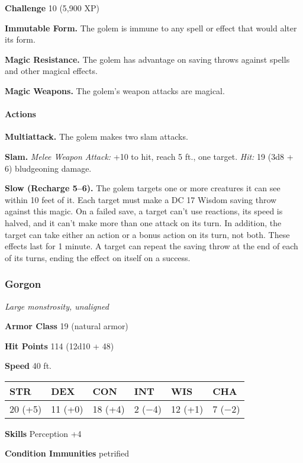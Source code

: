 \documentclass[
]{article}
\begin{document}
\textbf{Challenge} 10 (5,900 XP)

\textbf{Immutable Form.} The golem is immune to any spell or effect that
would alter its form.

\textbf{Magic Resistance.} The golem has advantage on saving throws
against spells and other magical effects.

\textbf{Magic Weapons.} The golem's weapon attacks are magical.

\hypertarget{actions-19}{%
\paragraph{Actions}\label{actions-19}}

\textbf{Multiattack.} The golem makes two slam attacks.

\textbf{Slam.} \emph{Melee Weapon Attack:} +10 to hit, reach 5 ft., one
target. \emph{Hit:} 19 (3d8 + 6) bludgeoning damage.

\textbf{Slow (Recharge 5--6).} The golem targets one or more creatures
it can see within 10 feet of it. Each target must make a DC 17 Wisdom
saving throw against this magic. On a failed save, a target can't use
reactions, its speed is halved, and it can't make more than one attack
on its turn. In addition, the target can take either an action or a
bonus action on its turn, not both. These effects last for 1 minute. A
target can repeat the saving throw at the end of each of its turns,
ending the effect on itself on a success.

\hypertarget{gorgon}{%
\subsubsection{Gorgon}\label{gorgon}}

\emph{Large monstrosity, unaligned}

\textbf{Armor Class} 19 (natural armor)

\textbf{Hit Points} 114 (12d10 + 48)

\textbf{Speed} 40 ft.

\begin{longtable}[]{@{}llllll@{}}
\toprule
STR & DEX & CON & INT & WIS & CHA\tabularnewline
\midrule
\endhead
20 (+5) & 11 (+0) & 18 (+4) & 2 (−4) & 12 (+1) & 7 (−2)\tabularnewline
\bottomrule
\end{longtable}

\textbf{Skills} Perception +4

\textbf{Condition Immunities} petrified
\end{document}

